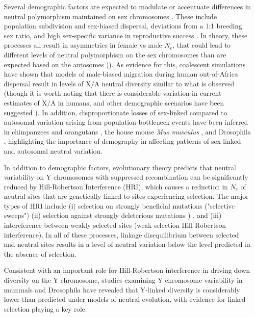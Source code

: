 \documentclass[9pt,twocolumn,twoside]{gsajnl}
\begin{document}
Several demographic factors are expected to modulate or accentuate differences in neutral polymorphism maintained on sex chromosomes \citep{ellegren2009}. These include population subdivision and sex-biased dispersal, deviations from a 1:1 breeding sex ratio, and high sex-specific variance in reproductive success \citep{caballero1995,charlesworth2001,laporte2002,pool2007}. In theory, these processes all result in asymmetries in female vs male $N_{e}$, that could lead to different levels of neutral polymorphism on the sex chromosomes than are expected based on the autosomes (\citep{pool2007}). As evidence for this, coalescent simulations have shown that models of male-biased migration during human out-of-Africa dispersal result in levels of X/A neutral diversity similar to what is observed \citep{keinan2009} (though it is worth noting that there is considerable variation in current estimates of X/A in humans, and other demographic scenarios have been suggested \citep{hammer2010,bustamante2009}). In addition, disproportionate losses of sex-linked compared to autosomal variation arising from population bottleneck events have been inferred in chimpanzees and orangutans \citep{kaessmann2001,fischer2006}, the house mouse \textit{Mus musculus} \citep{baines2007}, and Drosophila \citep{andolfatto2001}, highlighting the importance of demography in affecting patterns of sex-linked and autosomal neutral variation.

In addition to demographic factors, evolutionary theory predicts that neutral variability on Y chromosomes with suppressed recombination can be significantly reduced by Hill-Robertson Interference (HRI), which causes a reduction in $N_{e}$ of neutral sites that are genetically linked to sites experiencing selection. The major types of HRI include (i) selection on strongly beneficial mutations ("selective sweeps") \citep{smith1974hitch,aquadro1994} (ii) selection against strongly deleterious mutations
) \citep{charlesworth1996background,charlesworth1994effect} \citep{charlesworth1996CB,charlesworth2000degeneration}, and (iii) intereference between weakly selected sites (weak selection Hill-Robertson interference). In all of these processes, linkage  disequilibrium between selected and neutral sites results in a level of neutral variation below the level predicted in the absence of selection. 


Consistent with an important role for Hill-Robertson interference in driving down diversity on the Y chromosome, studies examining Y chromosome variability in mammals \citep{hellborg2004,bachtrog2013NRG,Wilsonsayres2014} and Drosophila \citep{mcallister1999,bachtrog2000} have revealed that Y-linked diversity is considerably lower than predicted under models of neutral evolution, with evidence for linked selection playing a key role.
\end{document}
